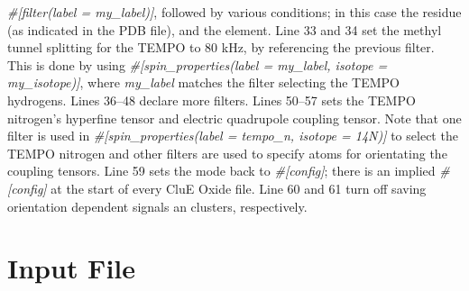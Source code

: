 \documentclass{book}
\begin{document}
\textit{\#[filter(label = my\_label)]}, 
followed by various conditions; 
in this case the residue (as indicated in the PDB file),
and the element.
Line 33 and 34 set the methyl tunnel splitting for the TEMPO to 80 kHz,
by referencing the previous filter.
This is done by using 
\textit{\#[spin\_properties(label = my\_label, isotope = my\_isotope)]},
where \textit{my\_label} matches the filter selecting the TEMPO
hydrogens.
Lines 36--48 declare more filters.
Lines 50--57 sets the TEMPO nitrogen's hyperfine tensor and 
electric quadrupole coupling tensor.
Note that one filter is used in 
\textit{\#[spin\_properties(label = tempo\_n, isotope = 14N)]}
to select the TEMPO nitrogen and other filters are used to specify atoms
for orientating the coupling tensors.
Line 59 sets the mode back to \textit{\#[config]}; there is an implied 
\textit{\#[config]} at the start of every CluE Oxide file.
Line 60 and 61 turn off saving orientation dependent signals an clusters,
respectively.
\section{Input File}
\end{document}
